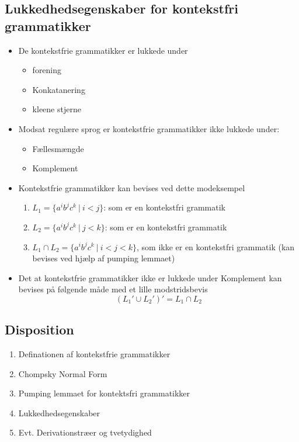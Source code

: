 \documentclass[a4, danish]{article}
\begin{document}
\subsection{Lukkedhedsegenskaber for kontekstfri grammatikker}
\begin{itemize}
  \item De kontekstfrie grammatikker er lukkede under 
  \begin{itemize}
    \item forening
    \item Konkatanering
    \item kleene stjerne
  \end{itemize}
  \item Modsat regulære sprog er kontekstfrie grammatikker ikke lukkede under:  
  \begin{itemize}
    \item Fællesmængde
    \item Komplement
  \end{itemize}
  \item Kontekstfrie grammatikker kan bevises ved dette modeksempel
    \begin{enumerate}
    	\item $L_1= \{a^ib^jc^k \ | \ i<j \}$: som er en kontekstfri grammatik
    	\item $L_2= \{a^ib^jc^k \ | \ j<k \}$: som er en kontekstfri grammatik
      \item $L_1 \cap L_2 = \{a^ib^jc^k \ | \ i<j<k \}$, som ikke er en kontekstfri grammatik (kan bevises ved hjælp af pumping lemmaet)
    \end{enumerate}
  \item Det at kontekstfrie grammatikker ikke er lukkede under Komplement kan bevises på følgende måde med et lille modstridsbevis
  \begin{equation*}
    (L_1' \cup L_2')' = L_1 \cap L_2
  \end{equation*}
\end{itemize}


\newpage
\subsection{Disposition}
\begin{enumerate}
	\item Definationen af kontekstfrie grammatikker
  \item Chompsky Normal Form 
  \item Pumping lemmaet for kontektsfri grammatikker
  \item Lukkedhedsegenskaber
  \item Evt. Derivationstræer og tvetydighed 
\end{enumerate}

\newpage
  
\end{document}
